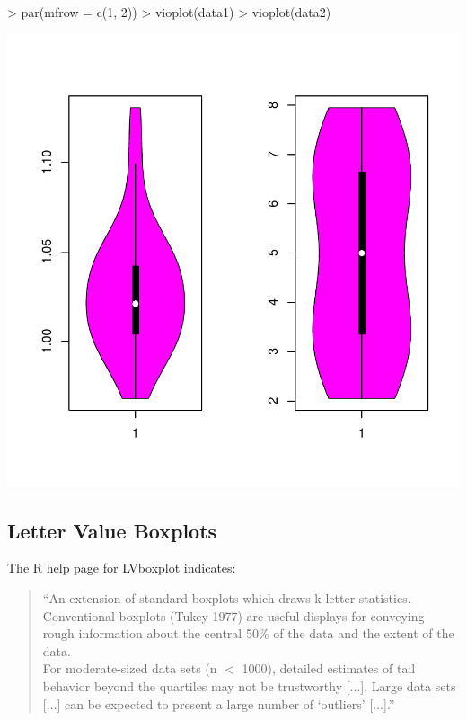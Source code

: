 \begin{Schunk}
\begin{Sinput}
> par(mfrow = c(1, 2))
> vioplot(data1)
> vioplot(data2)
\end{Sinput}
\end{Schunk}
\includegraphics{lect_chapter5_v2-013}


\newpage


\subsection{Letter Value Boxplots}


The R help page for LVboxplot indicates:
\begin{quotation}
``An extension of standard boxplots which draws k letter statistics. Conventional boxplots (Tukey 1977) 
are useful displays for conveying rough information about the central 50\% of the data and the 
extent of the data. \\[0.2cm]
For moderate-sized data sets (n $<$ 1000), detailed estimates of tail behavior beyond the quartiles 
may not be trustworthy [$\ldots$]. Large data sets [$\ldots$] can be expected to present a large 
number of `outliers' [$\ldots$].''
\end{quotation}


